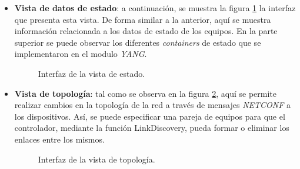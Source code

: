 \begin{itemize}
    \item \textbf{Vista de datos de estado}: a continuación, se muestra la figura \ref{fig:captura_web_estado} la interfaz que presenta esta vista. De forma similar a la anterior, aquí se muestra información relacionada a los datos de estado de los equipos. En la parte superior se puede observar los diferentes \textit{containers} de estado que se implementaron en el modulo \textit{YANG}.  
    
    \begin{figure}[H]
        \centering
        \caption{Interfaz de la vista de estado.}
        \label{fig:captura_web_estado}
      \end{figure}

    \item \textbf{Vista de topología}: tal como se observa en la figura \ref{fig:captura_web_topo}, aquí se permite realizar cambios en la topología de la red a través de mensajes \textit{NETCONF} a los dispositivos. Así, se puede especificar una pareja de equipos para que el controlador, mediante la función LinkDiscovery, pueda formar o eliminar los enlaces entre los mismos.
    
    \begin{figure}[H]
        \centering
        \caption{Interfaz de la vista de topología.}
        \label{fig:captura_web_topo}
      \end{figure}
    

\end{itemize}
